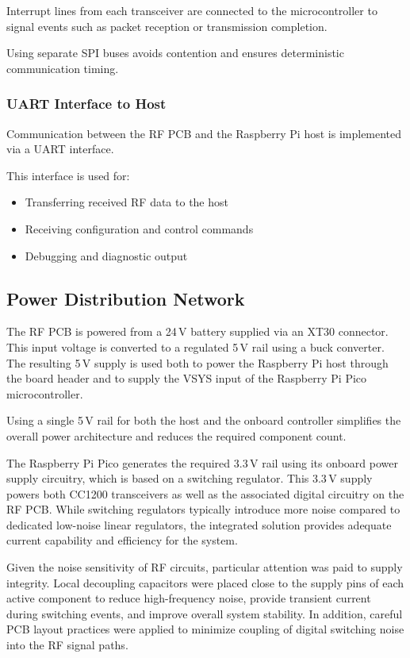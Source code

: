 Interrupt lines from each transceiver are connected to the microcontroller to signal events such as packet reception or transmission completion.

Using separate SPI buses avoids contention and ensures deterministic communication timing.

\subsubsection{UART Interface to Host}
\label{subsubsec:rf_uart}

Communication between the RF PCB and the Raspberry Pi host is implemented via a UART interface.

This interface is used for:

\begin{itemize}
\item Transferring received RF data to the host
\item Receiving configuration and control commands
\item Debugging and diagnostic output
\end{itemize}

\subsection{Power Distribution Network}
\label{subsec:rf_power}

The RF PCB is powered from a 24\,V battery supplied via an XT30 connector. This input voltage is converted to a regulated 5\,V rail using a buck converter. The resulting 5\,V supply is used both to power the Raspberry Pi host through the board header and to supply the VSYS input of the Raspberry Pi Pico microcontroller.

Using a single 5\,V rail for both the host and the onboard controller simplifies the overall power architecture and reduces the required component count.

The Raspberry Pi Pico generates the required 3.3\,V rail using its onboard power supply circuitry, which is based on a switching regulator. This 3.3\,V supply powers both CC1200 transceivers as well as the associated digital circuitry on the RF PCB. While switching regulators typically introduce more noise compared to dedicated low-noise linear regulators, the integrated solution provides adequate current capability and efficiency for the system.

Given the noise sensitivity of RF circuits, particular attention was paid to supply integrity. Local decoupling capacitors were placed close to the supply pins of each active component to reduce high-frequency noise, provide transient current during switching events, and improve overall system stability. In addition, careful PCB layout practices were applied to minimize coupling of digital switching noise into the RF signal paths.

